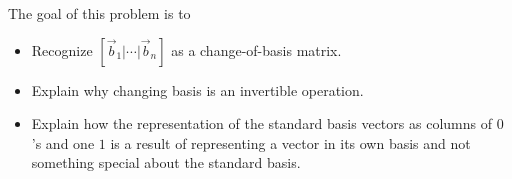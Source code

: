 \documentclass{workbook}
\newcommand{\bookonlynewpage}{\begin{bookonly}\newpage\end{bookonly}}
\begin{document}
\begin{slide}
	\bookonlynewpage
	\question\label{ProbBasisChangeMatrix}
	\begin{annotation}
		\begin{goals}

			The goal of this problem is to
			\begin{itemize}
				\item Recognize $[\vec b_1|\cdots|\vec b_n]$ as a change-of-basis matrix.
				\item Explain why changing basis is an invertible operation.
				\item Explain how the representation of the standard basis vectors as columns
					of $0$'s and one $1$ is a result of representing a vector in its own
					basis and not something special about the standard basis.
			\end{itemize}
		\end{goals}


\end{annotation}
\end{slide}
\end{document}
